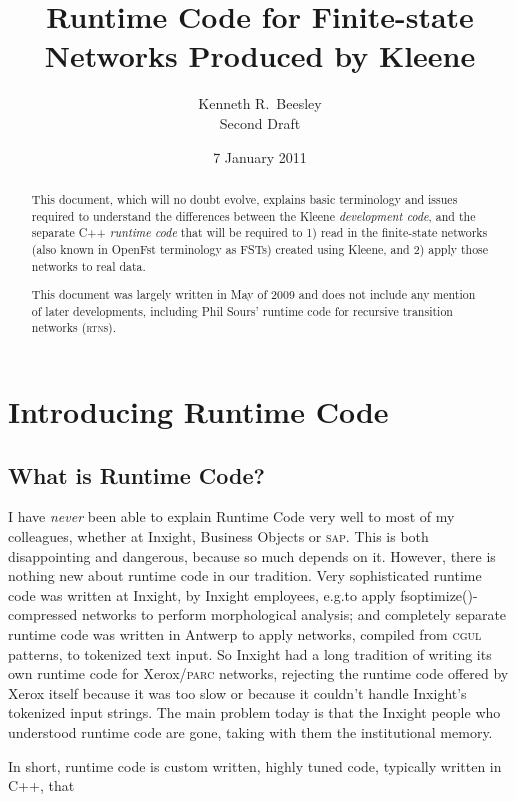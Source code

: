 \documentclass[letterpaper,12pt]{article}
\title{Runtime Code for Finite-state Networks Produced by Kleene}
\author{Kenneth R.~Beesley\\Second Draft}
\date{7 January 2011}
\providecommand{\acro}{}\renewcommand{\acro}{\textsc}
\begin{document}
\maketitle


\begin{abstract}
This document, which will no doubt evolve, explains basic terminology and issues required
to understand the differences between the Kleene \emph{development code}, and the separate C++
\emph{runtime code} that will be required to 1) read in the finite-state networks (also known in
OpenFst terminology as FSTs) created
using Kleene, and 2) apply those networks to real data.

This document was largely written in May of 2009 and does not include any
mention of later developments, including Phil Sours' runtime code for
recursive transition networks (\acro{rtn}s).
\end{abstract}

\newpage

\section{Introducing Runtime Code}

\subsection{What is Runtime Code?}

I have \emph{never} been able to explain Runtime Code very well to most
of my colleagues, 
whether at Inxight, Business Objects or \acro{sap}.  This
is both disappointing and dangerous, because so much depends on it.  However, there is nothing new about runtime
code in our tradition.  Very sophisticated runtime code was written at Inxight, by Inxight employees, e.g.\@ to
apply fsoptimize()-compressed networks to perform morphological analysis; and completely separate runtime code was
written in Antwerp to apply networks, compiled from \acro{cgul} patterns, to tokenized text input.  So Inxight had a long
tradition of writing its own runtime code
for Xerox/\acro{parc} networks, rejecting the runtime code offered by
	Xerox itself because it was too slow or because it couldn't handle
	Inxight's tokenized input strings.
The main problem today is that the Inxight
people who understood runtime code are gone, taking with them the institutional memory.

In
short, runtime code is custom written, highly tuned code, typically written in C++, that
\end{document}
